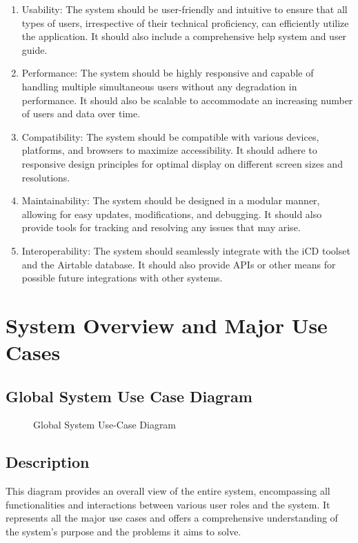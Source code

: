 \begin{enumerate}
    \item Usability: The system should be user-friendly and intuitive to ensure that all types of users, irrespective of their technical proficiency, can efficiently utilize the application. It should also include a comprehensive help system and user guide.
    \item Performance: The system should be highly responsive and capable of handling multiple simultaneous users without any degradation in performance. It should also be scalable to accommodate an increasing number of users and data over time.
    \item Compatibility: The system should be compatible with various devices, platforms, and browsers to maximize accessibility. It should adhere to responsive design principles for optimal display on different screen sizes and resolutions.
    \item Maintainability: The system should be designed in a modular manner, allowing for easy updates, modifications, and debugging. It should also provide tools for tracking and resolving any issues that may arise.
    \item Interoperability: The system should seamlessly integrate with the iCD toolset and the Airtable database. It should also provide APIs or other means for possible future integrations with other systems.
\end{enumerate}



\section{System Overview and Major Use Cases}

\subsection{Global System Use Case Diagram}
\begin{figure}[H]
    \centering
    \caption{ Global System Use-Case Diagram }
    \label{fig:Global_System_UseCase_Diagram}
\end{figure}

\subsection*{Description}
This diagram provides an overall view of the entire system, encompassing all functionalities and interactions between various user roles and the system. It represents all the major use cases and offers a comprehensive understanding of the system's purpose and the problems it aims to solve.

